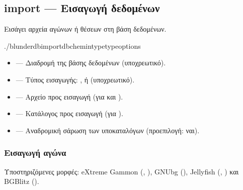 \documentclass[letterpaper,10pt,greek]{sphinxmanual}
\begin{document}
\subsection{import — Εισαγωγή δεδομένων}
\label{\detokenize{cli:import-importer-des-donnees}}
\sphinxAtStartPar
Εισάγει αρχεία αγώνων ή θέσεων στη βάση δεδομένων.

\begin{sphinxVerbatim}[commandchars=\\\{\}]
./blunderdbimport\PYGZhy{}\PYGZhy{}db\PYGZlt{}chemin\PYGZgt{}\PYGZhy{}\PYGZhy{}type\PYGZlt{}type\PYGZgt{}\PYG{o}{[}options\PYG{o}{]}
\end{sphinxVerbatim}

\sphinxAtStartPar
{}
\begin{itemize}
\item {} 
\sphinxAtStartPar
{} — Διαδρομή της βάσης δεδομένων (υποχρεωτικό).

\item {} 
\sphinxAtStartPar
{} — Τύπος εισαγωγής: ,  ή  (υποχρεωτικό).

\item {} 
\sphinxAtStartPar
{} — Αρχείο προς εισαγωγή (για  και ).

\item {} 
\sphinxAtStartPar
{} — Κατάλογος προς εισαγωγή (για ).

\item {} 
\sphinxAtStartPar
{} — Αναδρομική σάρωση των υποκαταλόγων (προεπιλογή: ναι).

\end{itemize}


\subsubsection{Εισαγωγή αγώνα}
\label{\detokenize{cli:import-d-un-match}}
\sphinxAtStartPar
Υποστηριζόμενες μορφές: eXtreme Gammon (, ), GNUbg (), Jellyfish (, ) και BGBlitz ().
\end{document}
